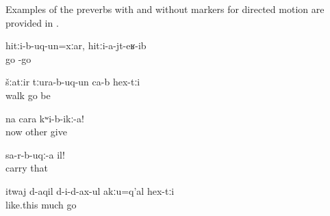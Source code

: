 Examples of the preverbs with and without markers for directed motion are provided in .
%
\begin{exe}
	\ex	\label{ex:Even though (the hare) run after (the turtle), it did not reach it verbs}
	\gll	hitːi-b-uq-un=xːar,	hitːi-a-jt-eʁ-ib\\
		go	-go\\
	\glt	{}

	\ex	\label{ex:They went out for a walk verbs}
	\gll	šːatːir	tːura-b-uq-un	ca-b	hex-tːi\\
		walk	go	be	\\
	\glt	{}

	\ex	\label{ex:Now give another (picture) verbs}
	\gll	na	cara	kʷi-b-ikː-a!\\
		now	other	give\\
	\glt	{}

	\ex	\label{ex:Take it away (from in front) verbs}
	\gll	sa-r-b-uqː-a	il!\\
		carry	that\\
	\glt	{}

	\ex	\label{ex:Otherwise not much (hay) fits inside verbs}
	\gll	itwaj	d-aqil	d-i-d-ax-ul	akːu=q'al	hex-tːi\\
		like.this	much	go		\\
	\glt	{}
\end{exe}

